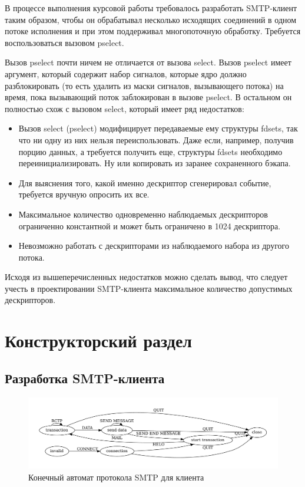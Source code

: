 \documentclass[a4paper,12pt]{report}
\begin{document}
	В процессе выполнения курсовой работы требовалось разработать SMTP-клиент таким образом, чтобы он обрабатывал несколько исходящих соединений в одном потоке исполнения и при этом поддерживал многопоточную обработку. Требуется воспользоваться вызовом pselect.

	Вызов pselect почти ничем не отличается от вызова select. Вызов pselect имеет аргумент, который содержит набор сигналов, которые ядро должно разблокировать (то есть удалить из маски сигналов, вызывающего потока) на время, пока вызывающий поток заблокирован в вызове pselect. В остальном он полностью схож с вызовом select, который имеет ряд недостатков:

	\begin{itemize}
		\item Вызов select (pselect) модифицирует передаваемые ему структуры fdsets, так что ни одну из них нельзя переиспользовать. Даже если, например, получив порцию данных, а требуется получить еще, структуры fdsets необходимо переинициализировать. Ну или копировать из заранее сохраненного бэкапа.
		\item Для выяснения того, какой именно дескриптор сгенерировал событие, требуется вручную опросить их все.
		\item Максимальное количество одновременно наблюдаемых дескрипторов ограниченно константной и может быть ограничено в 1024 дескриптора.
		\item Невозможно работать с дескрипторами из наблюдаемого набора из другого потока.
	\end{itemize}

	Исходя из вышеперечисленных недостатков можно сделать вывод, что следует учесть в проектировании SMTP-клиента максимальное количество допустимых дескрипторов.

 	\chapter{Конструкторский раздел}

 	\section{Разработка SMTP-клиента}
    
    	\begin{figure}[h]
		\centering
		\includegraphics[width=\textwidth]{./include/smtp_states.pdf}
		\caption{Конечный автомат протокола SMTP для клиента}
		\label{fig:smtp_states}
	\end{figure}
     
\end{document}
